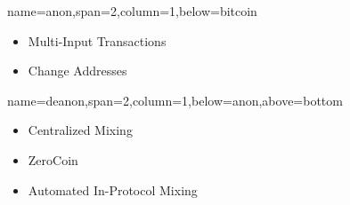 \documentclass[a0paper,portrait]{baposter}
\begin{document}
\begin{poster}
{name=anon,span=2,column=1,below=bitcoin}{

\begin{itemize}
  \item Multi-Input Transactions
  \item Change Addresses
\end{itemize}
}

{name=deanon,span=2,column=1,below=anon,above=bottom}{
  \begin{itemize}
    \item Centralized Mixing
    \item ZeroCoin
    \item Automated In-Protocol Mixing
  \end{itemize}
}

\end{poster}
\end{document}
